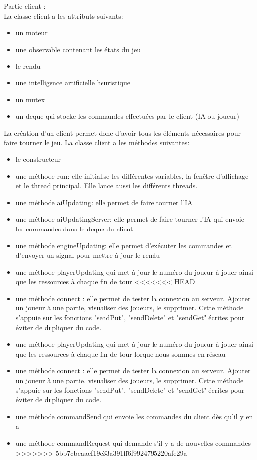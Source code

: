 \documentclass[12pt,a4paper]{article}
\begin{document}
Partie client : \\
La classe client a les attributs suivants:
\begin{itemize}
    \item un moteur
    \item une observable contenant les états du jeu
    \item le rendu
    \item une intelligence artificielle heuristique
    \item un mutex
    \item un deque qui stocke les commandes effectuées par le client (IA ou joueur)
\end{itemize}
La création d'un client permet donc d'avoir tous les éléments nécessaires pour faire tourner le jeu. 
La classe client a les méthodes suivantes:
\begin{itemize}
    \item le constructeur
    \item une méthode run: elle initialise les différentes variables, la fenêtre d'affichage et le thread principal. Elle lance aussi les différents threads.
    \item une méthode aiUpdating: elle permet de faire tourner l'IA 
    \item une méthode aiUpdatingServer: elle permet de faire tourner l'IA qui envoie les commandes dans le deque du client
    \item une méthode engineUpdating: elle permet d'exécuter les commandes et d'envoyer un signal pour mettre à jour le rendu
    \item une méthode playerUpdating qui met à jour le numéro du joueur à jouer ainsi que les ressources à chaque fin de tour
<<<<<<< HEAD
    \item une méthode connect : elle permet de tester la connexion au serveur. Ajouter un joueur à une partie, visualiser des joueurs, le supprimer. Cette méthode s'appuie sur les fonctions "sendPut", "sendDelete" et "sendGet" écrites pour éviter de dupliquer du code.
=======
    \item une méthode playerUpdating qui met à jour le numéro du joueur à jouer ainsi que les ressources à chaque fin de tour lorque nous sommes en réseau
    \item une méthode connect : elle permet de tester la connexion au serveur. Ajouter un joueur à une partie, visualiser des joueurs, le supprimer. Cette méthode s'appuie sur les fonctions "sendPut", "sendDelete" et "sendGet" écrites pour éviter de dupliquer du code.
    \item une méthode commandSend qui envoie les commandes du client dès qu'il y en a 
    \item une méthode commandRequest qui demande s'il y a de nouvelles commandes
>>>>>>> 5bb7cbeaacf19c33a391ff6f9924795220afe29a
\end{itemize}
\end{document}
